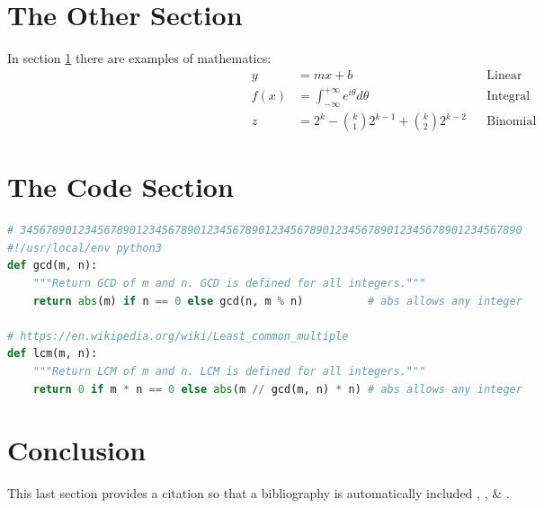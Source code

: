 \documentclass[11pt]{article}%
\begin{document}
\begin{multicols*}{2}
\section{The Other Section}
\label{The Other Section}

In section \ref{The Other Section} there are examples of
mathematics:\begin{align}
y &= mx+b && \text{Linear} \\
f(x) &= \int_{-\infty}^{+\infty} e^{i\theta} d\theta && \text{Integral} \\
z &= 2^k-\binom{k}{1}2^{k-1}+\binom{k}{2}2^{k-2} &&\text{Binomial}
\end{align}

\section{The Code Section}
\label{The Code Section}

\begin{lstlisting}[language=Python,caption=\code{m4tacolor.py} module,label=m4tacolor]
# 345678901234567890123456789012345678901234567890123456789012345678901234567890
#!/usr/local/env python3
def gcd(m, n):
    """Return GCD of m and n. GCD is defined for all integers."""
    return abs(m) if n == 0 else gcd(n, m % n)          # abs allows any integer

# https://en.wikipedia.org/wiki/Least_common_multiple
def lcm(m, n):
    """Return LCM of m and n. LCM is defined for all integers."""
    return 0 if m * n == 0 else abs(m // gcd(m, n) * n) # abs allows any integer
\end{lstlisting}

\section{Conclusion}
\label{Conclusion}

This last section provides a citation so that a bibliography is
automatically included \cite{book:knr}, \cite{book:middlemarch}, \&
\cite{book:engines-of-logic}.

\printbibliography %


\end{multicols*}
\end{document}
